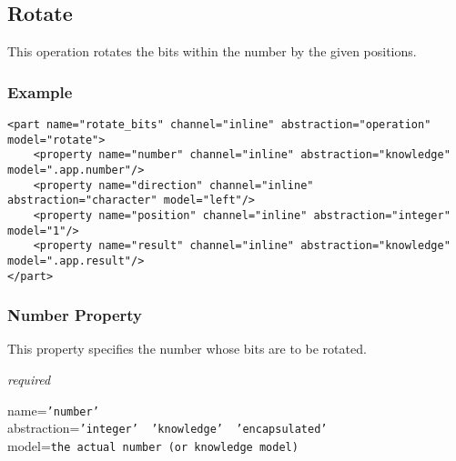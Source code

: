 %
%
%
%
%
%

\subsection{Rotate}
\label{rotate_heading}

This operation rotates the bits within the number by the given positions.

\subsubsection{Example}

\begin{scriptsize}
    \begin{verbatim}
<part name="rotate_bits" channel="inline" abstraction="operation" model="rotate">
    <property name="number" channel="inline" abstraction="knowledge" model=".app.number"/>
    <property name="direction" channel="inline" abstraction="character" model="left"/>
    <property name="position" channel="inline" abstraction="integer" model="1"/>
    <property name="result" channel="inline" abstraction="knowledge" model=".app.result"/>
</part>
    \end{verbatim}
\end{scriptsize}

\subsubsection{Number Property}

This property specifies the number whose bits are to be rotated.

\emph{required}

name=\texttt{'number'}\\
abstraction=\texttt{'integer' \vline\ 'knowledge' \vline\ 'encapsulated'}\\
model=\texttt{the actual number (or knowledge model)}

